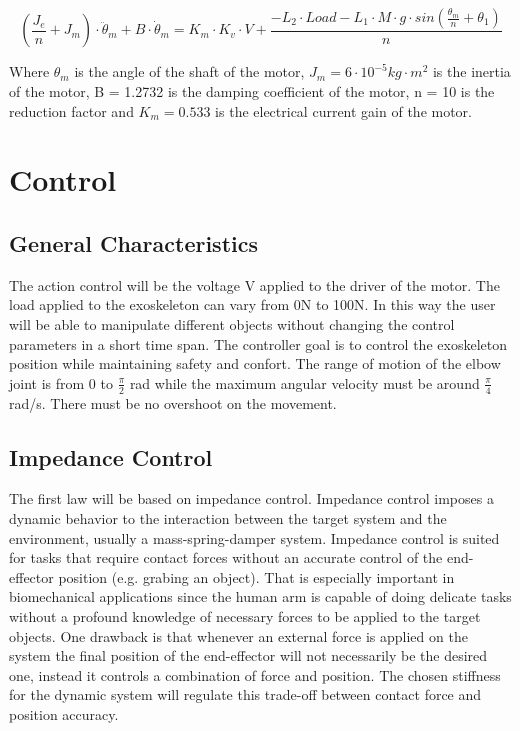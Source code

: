 \begin{equation}
\label{eq:plant dynamics}
\left(\frac{J_e}{n}+J_m\right)\cdot \ddot{\theta}_m+B \cdot \dot{\theta}_m = K_m \cdot K_v \cdot V +\frac{-L_2 \cdot Load - L_1 \cdot M \cdot g \cdot sin\left(\frac{\theta_m}{n}+\theta_1\right)}{n} 
\end{equation}

Where \(\theta_m\) is the angle of the shaft of the motor, \(J_m = 6 \cdot 10^{-5} kg \cdot m^2\) is the inertia of the motor, B = 1.2732 is the damping coefficient of the motor, n = 10 is the reduction factor and \(K_m = 0.533\) is the electrical current gain of the motor.

\section{Control}

\subsection{General Characteristics}

The action control will be the voltage V applied to the driver of the motor. 
The load applied to the exoskeleton can vary from 0N to 100N. In this way the user will be able to manipulate different objects without changing the control parameters in a short time span. The controller goal is to control the exoskeleton position while maintaining safety and confort. The range of motion of the elbow joint is from 0 to \(\frac{\pi}{2}\) rad while the maximum angular velocity must be around \(\frac{\pi}{4}\) rad/s. There must be no overshoot on the movement.

\subsection{Impedance Control}

The first law will be based on impedance control. Impedance control imposes a dynamic behavior to the interaction between the target system and the environment, usually a mass-spring-damper system.	
Impedance control is suited for tasks that require contact forces without an accurate control of the end-effector position (e.g. grabing an object). That is especially important in biomechanical applications since the human arm is capable of doing delicate tasks without a profound knowledge of necessary forces to be applied to the target objects. 
One drawback is that whenever an external force is applied on the system the final position of the end-effector will not necessarily be the desired one, instead it controls a combination of force and position. The chosen stiffness for the dynamic system will regulate this trade-off between contact force and position accuracy.

